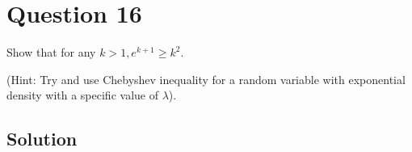 \section*{Question 16}

Show that for any \( k>1, e^{k+1} \geq k^{2} \).

(Hint: Try and use Chebyshev inequality for a random variable with exponential density with a specific value of \( \lambda \)).

\subsection*{Solution}
